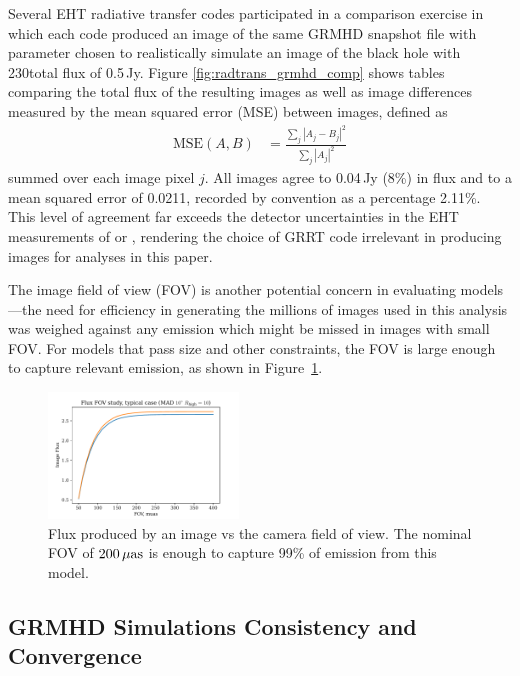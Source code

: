 Several EHT radiative transfer codes participated in a comparison exercise in which each code produced an image of the same GRMHD snapshot file  with parameter chosen to realistically simulate an image of the black hole  with 230\GHz total flux of 0.5\,Jy.  Figure \ref{fig:radtrans_grmhd_comp} shows tables comparing the total flux of the resulting images as well as image differences measured by the mean squared error (MSE) between images, defined as
\begin{align}
    \mathrm{MSE}(A, B) &= \frac{\sum_j|A_j-B_j|^2}{\sum_j|A_j|^2}
\end{align}
summed over each image pixel $j$. All images agree to 0.04\,Jy (8\%) in flux and to a mean squared error of 0.0211, recorded by convention as a percentage 2.11\%.  This level of agreement far exceeds the detector uncertainties in the EHT measurements of \sgra or , rendering the choice of GRRT code irrelevant in producing images for analyses in this paper.

The image field of view (FOV) is another potential concern in evaluating models---the need for efficiency in generating the millions of images used in this analysis was weighed against any emission which might be missed in images with small FOV. For models that pass size and other constraints, the FOV is large enough to capture relevant emission, as shown in Figure~\ref{fig:radtrans_fov_study}.

\begin{figure}
  \centering
  \includegraphics[width=0.45\textwidth]{figures/fov_study.pdf}
  \caption{Flux produced by an image vs the camera field of view. The nominal FOV of $200\,\mathrm{\mu as}$ is enough to capture 99\% of emission from this model.}
  \label{fig:radtrans_fov_study}
\end{figure}

\subsection{GRMHD Simulations Consistency and Convergence}\label{app:resolution_study}

